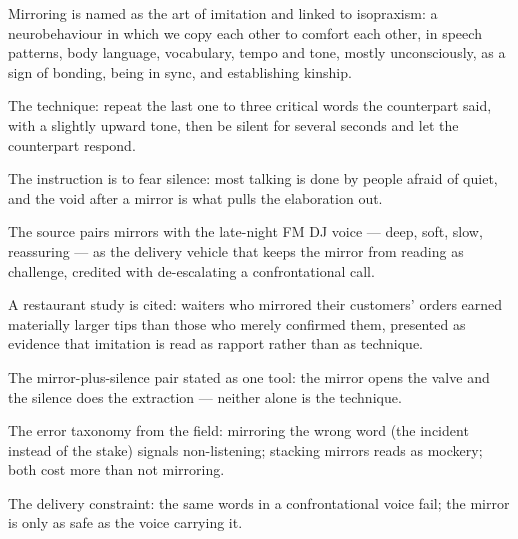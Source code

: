 

\begin{distilled}
  \item Mirroring is named as the art of imitation and linked to isopraxism: a neurobehaviour in which we copy each other to comfort each other, in speech patterns, body language, vocabulary, tempo and tone, mostly unconsciously, as a sign of bonding, being in sync, and establishing kinship.
  \item The technique: repeat the last one to three critical words the counterpart said, with a slightly upward tone, then be silent for several seconds and let the counterpart respond.
  \item The instruction is to fear silence: most talking is done by people afraid of quiet, and the void after a mirror is what pulls the elaboration out.
  \item The source pairs mirrors with the late-night FM DJ voice --- deep, soft, slow, reassuring --- as the delivery vehicle that keeps the mirror from reading as challenge, credited with de-escalating a confrontational call.
  \item A restaurant study is cited: waiters who mirrored their customers' orders earned materially larger tips than those who merely confirmed them, presented as evidence that imitation is read as rapport rather than as technique.
\end{distilled}

\begin{unique}
  \item The mirror-plus-silence pair stated as one tool: the mirror opens the valve and the silence does the extraction --- neither alone is the technique.
  \item The error taxonomy from the field: mirroring the wrong word (the incident instead of the stake) signals non-listening; stacking mirrors reads as mockery; both cost more than not mirroring.
  \item The delivery constraint: the same words in a confrontational voice fail; the mirror is only as safe as the voice carrying it.
\end{unique}
